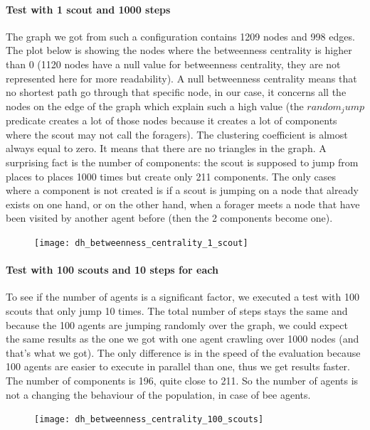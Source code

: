 \documentclass{article}
\begin{document}
		\paragraph{Test with 1 scout and 1000 steps}
			The graph we got from such a configuration contains 1209 nodes and 998 edges.
			The plot below is showing the nodes where the betweenness centrality is higher than 0
			(1120 nodes have a null value for betweenness centrality, they are not represented here for more readability).
			A null betweenness centrality means that no shortest path go through that specific node,
			in our case, it concerns all the nodes on the edge of the graph which explain such a high value
			(the $random_jump$ predicate creates a lot of those nodes because it creates a
			lot of components where the scout may not call the foragers).
			The clustering coefficient is almost always equal to zero.
			It means that there are no triangles in the graph.
			A surprising fact is the number of components: the scout is supposed to jump from places to places 1000 times
			but create only 211 components.
			The only cases where a component is not created is if a scout is jumping on a node that already exists on one hand,
			or on the other hand, when a forager meets a node that have been visited by another agent before
			(then the 2 components become one).
		\begin{figure}[!h]\hspace{2cm}
			\texttt{[image: dh\_betweenness\_centrality\_1\_scout]}
		\end{figure}
		\paragraph{Test with 100 scouts and 10 steps for each}
			To see if the number of agents is a significant factor, we executed a test with 100 scouts that only jump 10 times.
			The total number of steps stays the same and because the 100 agents are jumping randomly over the graph,
			we could expect the same results as the one we got with one agent crawling over 1000 nodes
			(and that's what we got).
			The only difference is in the speed of the evaluation because 100 agents are easier to execute in parallel than one,
			thus we get results faster.
			The number of components is 196, quite close to 211.
			So the number of agents is not a changing the behaviour of the population, in case of bee agents.
		\begin{figure}[!h]\hspace{2cm}
			\texttt{[image: dh\_betweenness\_centrality\_100\_scouts]}
		\end{figure}
\end{document}
